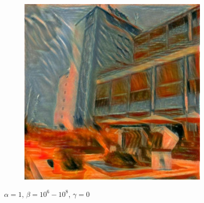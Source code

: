 \begin{figure}[H]
\begin{subfigure}[h]{0.3\textwidth}
    \end{subfigure}
    \begin{subfigure}[h]{0.3\textwidth}
        \centering
        \includegraphics[width=\textwidth]{resources/content/output/neural-style/htw-test-2-3.jpg}
    \end{subfigure}
    \caption{$ \alpha = 1 $, $ \beta = 10^{6} - 10^{8} $, $ \gamma = 0 $}
\end{figure}

